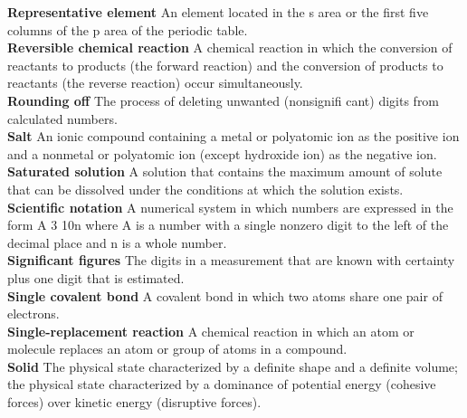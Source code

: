 \documentclass[10pt, roman]{article}
\begin{document}
\begin{minipage}[c]{0.30\textwidth}
\textbf{Representative element} An element located in the s area or the first five columns of the p area of the periodic table. \\
\textbf{Reversible chemical reaction} A chemical reaction in which the conversion of reactants to products (the forward reaction) and the conversion of products to reactants (the reverse reaction) occur simultaneously. \\
\textbf{Rounding off} The process of deleting unwanted (nonsignifi cant) digits from calculated numbers. \\
\textbf{Salt} An ionic compound containing a metal or polyatomic ion as the positive ion and a nonmetal or polyatomic ion (except hydroxide ion) as the negative ion. \\
\textbf{Saturated solution} A solution that contains the maximum amount of solute that can be dissolved under the conditions at which the solution exists. \\
\textbf{Scientific notation} A numerical system in which numbers are expressed in the form A 3 10n where A is a number with a single nonzero digit to the left of the decimal place and n is a whole number. \\
\textbf{Significant figures} The digits in a measurement that are known with certainty plus one digit that is estimated. \\
\textbf{Single covalent bond} A covalent bond in which two atoms share one pair of electrons. \\
\textbf{Single-replacement reaction} A chemical reaction in which an atom or molecule replaces an atom or group of atoms in a compound. \\
\textbf{Solid} The physical state characterized by a definite shape and a definite volume; the physical state characterized by a dominance of potential energy (cohesive forces) over kinetic energy (disruptive forces). \\
\end{minipage}%
\hfill
\end{document}
